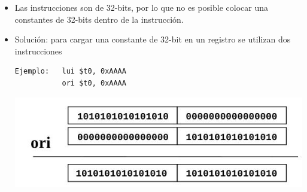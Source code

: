 \documentclass[aspectratio=169,compress]{beamer}
\begin{document}
\begin{footnotesize}
\begin{frame}[fragile]
\begin{itemize}
\item Las instrucciones son de 32-bits, por lo que no es posible colocar una constantes de 32-bits dentro de la instrucción.
\item Solución: para cargar una constante de 32-bit en un registro se utilizan dos instrucciones
\begin{verbatim}
Ejemplo:   lui $t0, 0xAAAA
           ori $t0, 0xAAAA
\end{verbatim}
\includegraphics[scale=0.4]{images/ori.jpg}
\end{itemize}
\end{frame}







\end{footnotesize}
\end{document}
